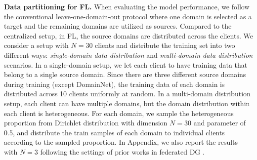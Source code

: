 \documentclass{article}
\theoremstyle{plain}
\theoremstyle{definition}
\theoremstyle{remark}
\begin{document}
\textbf{Data partitioning for FL.} When evaluating the  model performance, we follow the conventional leave-one-domain-out protocol where one domain is selected as a target    and the remaining domains are utilized as sources.  Compared to the centralized setup, in FL, the source domains are distributed across the  clients. We consider a setup with $N=30$ clients and distribute the training set into two different ways: \textit{single-domain data distribution} and \textit{multi-domain data distribution} scenarios. In a single-domain   setup, we let each client to have training data that belong to a single source domain. Since there are three different source domains during training (except DomainNet), the training data of each domain is distributed across 10 clients uniformly at random. In a multi-domain distribution setup, each client can have  multiple domains, but the domain distribution within each client is heterogeneous. For each domain, we sample the heterogeneous proportion from  Dirichlet distribution with dimension $N=30$ and  parameter of 0.5,  and distribute the train  samples of each domain to individual clients according to the sampled proportion.  In Appendix, we also report the results  with $N=3$ following the settings of prior  works in federated DG \cite{chen2023federated, nguyen2022fedsr}.

 
\end{document}
